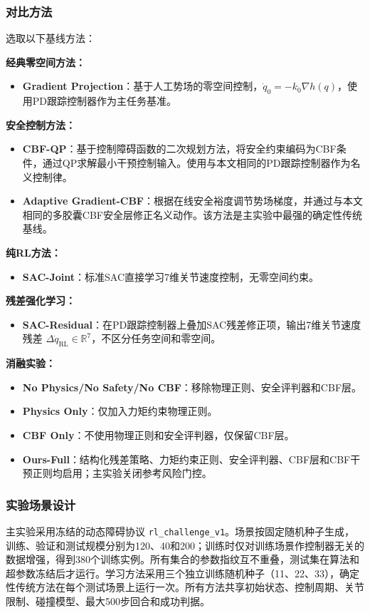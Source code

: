 \documentclass[10pt,conference]{IEEEtran}
\begin{document}
\subsubsection{对比方法}
选取以下基线方法：

\textbf{经典零空间方法：}
\begin{itemize}
\item \textbf{Gradient Projection}\cite{khatib1986real}：基于人工势场的零空间控制，$\dot{q}_0 = -k_0\nabla h(q)$，使用PD跟踪控制器作为主任务基准。
\end{itemize}

\textbf{安全控制方法：}
\begin{itemize}
\item \textbf{CBF-QP}\cite{ames2017control}：基于控制障碍函数的二次规划方法，将安全约束编码为CBF条件，通过QP求解最小干预控制输入。使用与本文相同的PD跟踪控制器作为名义控制律。
\item \textbf{Adaptive Gradient-CBF}：根据在线安全裕度调节势场梯度，并通过与本文相同的多胶囊CBF安全层修正名义动作。该方法是主实验中最强的确定性传统基线。
\end{itemize}

\textbf{纯RL方法：}
\begin{itemize}
\item \textbf{SAC-Joint}：标准SAC直接学习7维关节速度控制，无零空间约束。
\end{itemize}

\textbf{残差强化学习：}
\begin{itemize}
\item \textbf{SAC-Residual}：在PD跟踪控制器上叠加SAC残差修正项，输出7维关节速度残差 $\Delta\dot{q}_{\text{RL}} \in \mathbb{R}^7$，不区分任务空间和零空间。
\end{itemize}

\textbf{消融实验：}
\begin{itemize}
\item \textbf{No Physics/No Safety/No CBF}：移除物理正则、安全评判器和CBF层。
\item \textbf{Physics Only}：仅加入力矩约束物理正则。
\item \textbf{CBF Only}：不使用物理正则和安全评判器，仅保留CBF层。
\item \textbf{Ours-Full}：结构化残差策略、力矩约束正则、安全评判器、CBF层和CBF干预正则均启用；主实验关闭参考风险门控。
\end{itemize}

\subsubsection{实验场景设计}
主实验采用冻结的动态障碍协议 \texttt{rl\_challenge\_v1}。场景按固定随机种子生成，训练、验证和测试规模分别为120、40和200；训练时仅对训练场景作控制器无关的数据增强，得到380个训练实例。所有集合的参数指纹互不重叠，测试集在算法和超参数冻结后才运行。学习方法采用三个独立训练随机种子（11、22、33），确定性传统方法在每个测试场景上运行一次。所有方法共享初始状态、控制周期、关节限制、碰撞模型、最大500步回合和成功判据。
\end{document}
